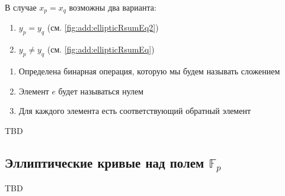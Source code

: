 В случае $x_p = x_q$ возможны два варианта:
\begin{enumerate}
\item $y_p = y_q$ (см. \autoref{fig:add:ellipticRsumEq2})
\item $y_p \ne y_q$ (см. \autoref{fig:add:ellipticRsumEq})
\end{enumerate}



\begin{enumerate}
\item Определена бинарная операция, которую мы будем называть сложением
\item Элемент $e$ будет называться нулем
\item Для каждого элемента есть соответствующий обратный элемент
\end{enumerate}
TBD

\subsection{Эллиптические кривые над полем $\mathbb{F}_p$}
TBD

